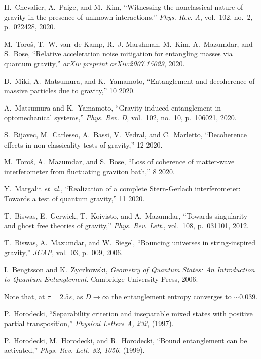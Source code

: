 \documentclass[%
 12pt,
 superscriptaddress,
 amsmath,
 amssymb,
 onecolumn,
 longbibliography
]{revtex4-2}
\begin{document}
\begin{thebibliography}{10}
H.~Chevalier, A.~Paige, and M.~Kim, ``{Witnessing the nonclassical nature of
  gravity in the presence of unknown interactions},'' {\em Phys. Rev. A},
  vol.~102, no.~2, p.~022428, 2020.

M.~Toro{\v{s}}, T.~W. van~de Kamp, R.~J. Marshman, M.~Kim, A.~Mazumdar, and
  S.~Bose, ``Relative acceleration noise mitigation for entangling masses via
  quantum gravity,'' {\em arXiv preprint arXiv:2007.15029}, 2020.

D.~Miki, A.~Matsumura, and K.~Yamamoto, ``{Entanglement and decoherence of
  massive particles due to gravity},'' 10 2020.

A.~Matsumura and K.~Yamamoto, ``{Gravity-induced entanglement in optomechanical
  systems},'' {\em Phys. Rev. D}, vol.~102, no.~10, p.~106021, 2020.

S.~Rijavec, M.~Carlesso, A.~Bassi, V.~Vedral, and C.~Marletto, ``{Decoherence
  effects in non-classicality tests of gravity},'' 12 2020.

M.~Toro\v{s}, A.~Mazumdar, and S.~Bose, ``{Loss of coherence of matter-wave
  interferometer from fluctuating graviton bath},'' 8 2020.

Y.~Margalit {\em et~al.}, ``{Realization of a complete Stern-Gerlach
  interferometer: Towards a test of quantum gravity},'' 11 2020.

T.~Biswas, E.~Gerwick, T.~Koivisto, and A.~Mazumdar, ``{Towards singularity and
  ghost free theories of gravity},'' {\em Phys. Rev. Lett.}, vol.~108,
  p.~031101, 2012.

T.~Biswas, A.~Mazumdar, and W.~Siegel, ``{Bouncing universes in string-inspired
  gravity},'' {\em JCAP}, vol.~03, p.~009, 2006.

I.~Bengtsson and K.~Zyczkowski, {\em Geometry of Quantum States: An
  Introduction to Quantum Entanglement}.
\newblock Cambridge University Press, 2006.

Note that, at $\tau =2.5s$, as $D \to \infty $ the entanglement entropy
  converges to $\sim 0.039$.

P.~Horodecki, ``Separability criterion and inseparable mixed states with
  positive partial transposition,'' {\em Physical Letters A, 232}, (1997).

P.~Horodecki, M.~Horodecki, and R.~Horodecki, ``Bound entanglement can be
  activated,'' {\em Phys. Rev. Lett. 82, 1056}, (1999).


\end{thebibliography}
\end{document}
